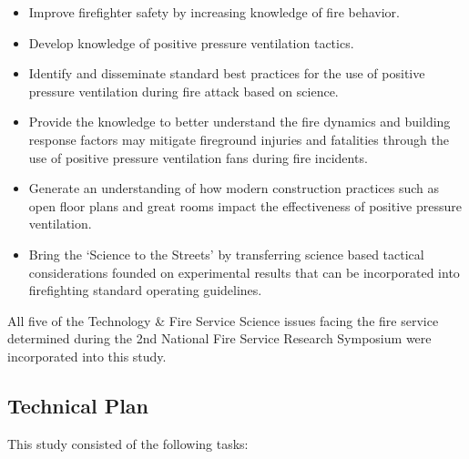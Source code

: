 \documentclass{article}
\begin{document}
\begin{itemize}
	\item Improve firefighter safety by increasing knowledge of fire behavior.
	\item Develop knowledge of positive pressure ventilation tactics.
	\item Identify and disseminate standard best practices for the use of positive pressure ventilation during fire attack based on science.
	\item Provide the knowledge to better understand the fire dynamics and building response factors may mitigate fireground injuries and fatalities through the use of positive pressure ventilation fans during fire incidents.
	\item Generate an understanding of how modern construction practices such as open floor plans and great rooms impact the effectiveness of positive pressure ventilation.
	\item Bring the ‘Science to the Streets’ by transferring science based tactical considerations founded on experimental results that can be incorporated into firefighting standard operating guidelines.
\end{itemize}

All five of the Technology \& Fire Service Science issues facing the fire service determined during the 2nd National Fire Service Research Symposium \cite{NFFF} were incorporated into this study.

\subsection{Technical Plan}

This study consisted of the following tasks:
\end{document}
